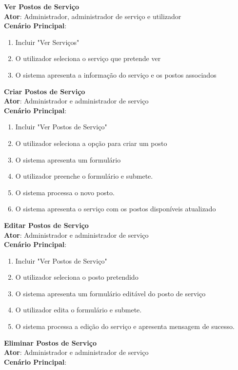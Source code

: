 {\large\textbf{Ver Postos de Serviço}} \\
\textbf{Ator}: Administrador, administrador de serviço e utilizador \\
\textbf{Cenário Principal}:

\begin{enumerate}[nolistsep]
	\item Incluir "Ver Serviços" 
	\item O utilizador seleciona o serviço que pretende ver 
	\item O sistema apresenta a informação do serviço e os postos associados
\end{enumerate}

{\large\textbf{Criar Postos de Serviço}} \\
\textbf{Ator}: Administrador e administrador de serviço \\
\textbf{Cenário Principal}:

\begin{enumerate}[nolistsep]
	\item Incluir "Ver Postos de Serviço"
	\item O utilizador seleciona a opção para criar um posto
	\item O sistema apresenta um formulário 
	\item O utilizador preenche o formulário e submete.
	\item O sistema processa o novo posto.
	\item O sistema apresenta o serviço com os postos disponíveis atualizado 
\end{enumerate}

{\large\textbf{Editar Postos de Serviço}} \\
\textbf{Ator}: Administrador e administrador de serviço \\
\textbf{Cenário Principal}:

\begin{enumerate}[nolistsep]
	\item Incluir "Ver Postos de Serviço"
	\item O utilizador seleciona o posto pretendido
	\item O sistema apresenta um formulário editável do posto de serviço
	\item O utilizador edita o formulário e submete.
	\item O sistema processa a edição do serviço e apresenta mensagem de sucesso.
\end{enumerate}

{\large\textbf{Eliminar Postos de Serviço}} \\
\textbf{Ator}: Administrador e administrador de serviço \\
\textbf{Cenário Principal}:

